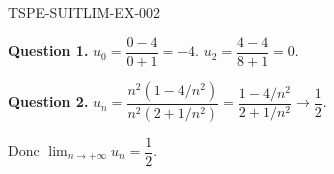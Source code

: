 \begin{corrige}{TSPE-SUITLIM-EX-002}


\textbf{Question 1.} $u_0 = \dfrac{0 - 4}{0 + 1} = -4$. \quad $u_2 = \dfrac{4 - 4}{8 + 1} = 0$.


\textbf{Question 2.} $u_n = \dfrac{n^2(1 - 4/n^2)}{n^2(2 + 1/n^2)} = \dfrac{1 - 4/n^2}{2 + 1/n^2} \to \dfrac{1}{2}$.

Donc $\boxed{\lim_{n \to +\infty} u_n = \dfrac{1}{2}}$.

\end{corrige}
